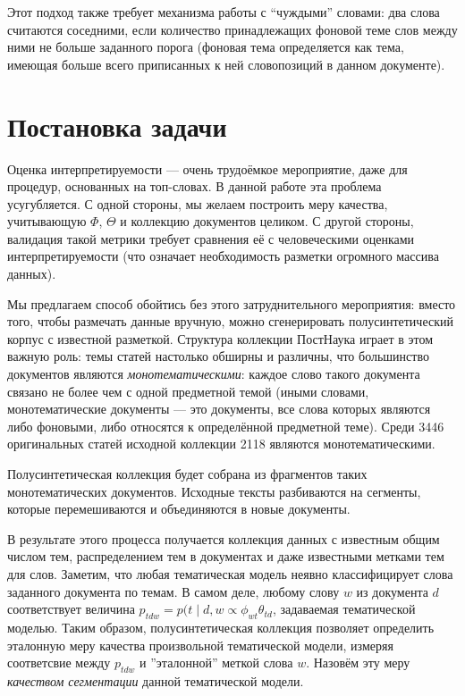 Этот подход также требует механизма работы с ``чуждыми'' словами: два слова считаются соседними, если количество принадлежащих фоновой теме слов между ними не больше заданного порога (фоновая тема определяется как тема, имеющая больше всего приписанных к ней словопозиций в данном документе).

\section{Постановка задачи}

Оценка интерпретируемости --- очень трудоёмкое мероприятие, даже для процедур, основанных на топ-словах. 
В данной работе эта проблема усугубляется. С одной стороны, мы желаем построить меру качества, учитывающую $\Phi$, $\Theta$ и коллекцию документов целиком. С другой стороны, валидация такой метрики требует сравнения её с человеческими оценками интерпретируемости (что означает необходимость разметки огромного массива данных).

Мы предлагаем способ обойтись без этого затруднительного мероприятия: вместо того, чтобы размечать данные вручную, можно сгенерировать полусинтетический корпус с известной разметкой. Структура коллекции ПостНаука играет в этом важную роль: темы статей настолько обширны и различны, что большинство документов являются \textit{монотематическими}: каждое слово такого документа связано не более чем с одной предметной темой (иными словами, монотематические документы --- это документы, все слова которых являются либо фоновыми, либо относятся к определённой предметной теме). Среди 3446 оригинальных статей исходной коллекции 2118 являются монотематическими. 

Полусинтетическая коллекция будет собрана из фрагментов таких монотематических документов. Исходные тексты разбиваются на сегменты, которые перемешиваются и объединяются в новые документы.


В результате этого процесса получается коллекция данных с известным общим числом тем, распределением тем в документах и даже известными метками тем для слов. Заметим, что любая тематическая модель неявно классифицирует слова заданного документа по темам. В самом деле, любому слову $w$ из документа $d$ соответствует величина $p_{tdw} = p(t \mid d, w \propto \phi_{wt}\theta_{td}$, задаваемая тематической моделью. Таким образом, полусинтетическая коллекция позволяет определить эталонную меру качества произвольной тематической модели, измеряя соответсвие между $p_{tdw}$ и ''эталонной'' меткой слова $w$. Назовём эту меру \textit{качеством сегментации} данной тематической модели. 
  
